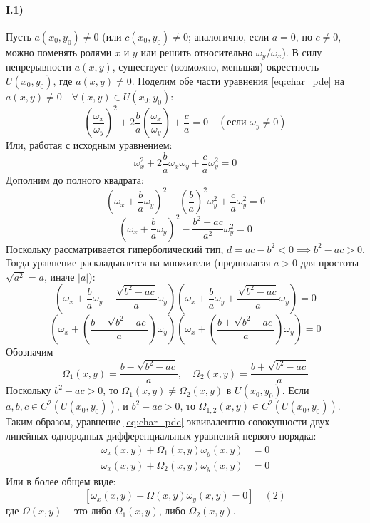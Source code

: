 \documentclass[12pt, a4paper]{article}
\begin{document}
\paragraph{I.1)} Пусть $a(x_0, y_0) \neq 0$ (или $c(x_0, y_0) \neq 0$; аналогично, если $a=0$, но $c \neq 0$, можно поменять ролями $x$ и $y$ или решить относительно $\omega_y/\omega_x$).
В силу непрерывности $a(x,y)$, существует (возможно, меньшая) окрестность $U(x_0, y_0)$, где $a(x,y) \neq 0$.
Поделим обе части уравнения \eqref{eq:char_pde} на $a(x,y) \neq 0 \quad \forall (x,y) \in U(x_0, y_0)$:
\[
\left(\frac{\omega_x}{\omega_y}\right)^2 + 2\frac{b}{a}\left(\frac{\omega_x}{\omega_y}\right) + \frac{c}{a} = 0 \quad (\text{если } \omega_y \neq 0)
\]
Или, работая с исходным уравнением:
\[
\omega_x^2 + 2\frac{b}{a}\omega_x\omega_y + \frac{c}{a}\omega_y^2 = 0
\]
Дополним до полного квадрата:
\[
\left(\omega_x + \frac{b}{a}\omega_y\right)^2 - \left(\frac{b}{a}\right)^2\omega_y^2 + \frac{c}{a}\omega_y^2 = 0
\]
\[
\left(\omega_x + \frac{b}{a}\omega_y\right)^2 - \frac{b^2-ac}{a^2}\omega_y^2 = 0
\]
Поскольку рассматривается гиперболический тип, $d = ac-b^2 < 0 \implies b^2-ac > 0$.
Тогда уравнение раскладывается на множители (предполагая $a>0$ для простоты $\sqrt{a^2}=a$, иначе $|a|$):
\[
\left( \omega_x + \frac{b}{a}\omega_y - \frac{\sqrt{b^2-ac}}{a}\omega_y \right) \left( \omega_x + \frac{b}{a}\omega_y + \frac{\sqrt{b^2-ac}}{a}\omega_y \right) = 0
\]
\[
\left( \omega_x + \left(\frac{b - \sqrt{b^2-ac}}{a}\right)\omega_y \right) \left( \omega_x + \left(\frac{b + \sqrt{b^2-ac}}{a}\right)\omega_y \right) = 0
\]
Обозначим
\[ \Omega_1(x,y) = \frac{b - \sqrt{b^2-ac}}{a}, \quad \Omega_2(x,y) = \frac{b + \sqrt{b^2-ac}}{a} \]
Поскольку $b^2-ac > 0$, то $\Omega_1(x,y) \neq \Omega_2(x,y)$ в $U(x_0,y_0)$.
Если $a,b,c \in C^2(U(x_0,y_0))$, и $b^2-ac > 0$, то $\Omega_{1,2}(x,y) \in C^2(U(x_0,y_0))$.
Таким образом, уравнение \eqref{eq:char_pde} эквивалентно совокупности двух линейных однородных дифференциальных уравнений первого порядка:
\begin{align}
\omega_x(x,y) + \Omega_1(x,y)\omega_y(x,y) &= 0 \label{eq:char_ode1_pde_form} \\
\omega_x(x,y) + \Omega_2(x,y)\omega_y(x,y) &= 0 \label{eq:char_ode2_pde_form}
\end{align}
Или в более общем виде:
\begin{equation} \label{eq:char_pde_factor_generic}
[\omega_x(x,y) + \Omega(x,y)\omega_y(x,y) = 0] \quad (2)
\end{equation}
где $\Omega(x,y)$ -- это либо $\Omega_1(x,y)$, либо $\Omega_2(x,y)$.
\end{document}

